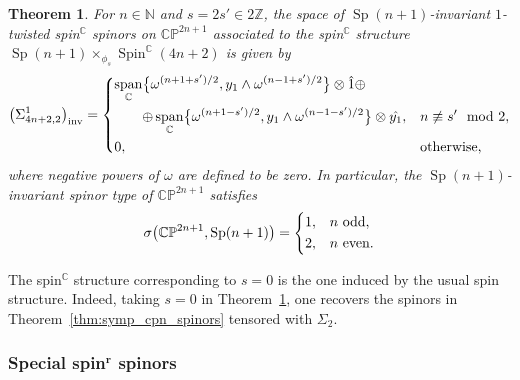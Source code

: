 \documentclass[pdftex]{sigma}
\numberwithin{equation}{section}
\newtheorem{Theorem}{Theorem}[section]
\newcommand{\Z}{\mathbb{Z}} %
\newcommand{\N}{\mathbb{N}} %
\newcommand{\C}{\mathbb{C}} %
\DeclareMathOperator{\vecspan}{span}
\DeclareMathOperator{\Spin}{Spin}
\DeclareMathOperator{\Sp}{Sp}
\begin{document}
		\begin{Theorem} \label{thm:inv_gen_cpn2}
			For $n \in \N$ and $s=2s' \in 2\Z$, the space  of $\Sp(n+1)$-invariant $1$-twisted spin$^{\mathbb{C}}$ spinors on $\mathbb{CP}^{2n+1}$ associated to the spin$^{\mathbb{C}}$ structure $\Sp(n+1) \times_{\phi_s} \Spin^{\mathbb{C}}(4n+2)$ is given by
			\begin{equation*}
				\bigl(\Sigma_{4n+2,2}^{1}\bigr)_{\mathrm{inv}} =
				\begin{dcases}
					\vecspan_{\mathbb{C}} \bigl\{ \omega^{(n+1+s')/2} , y_1 \wedge \omega^{(n-1+s')/2} \bigr\} \otimes \hat{1} \oplus \\
					\qquad \oplus \vecspan_{\mathbb{C}}\bigl\{ \omega^{(n+1-s')/2} , y_1 \wedge \omega^{(n-1-s')/2} \bigr\} \otimes \hat{y_1}, & n \not\equiv s' \mod 2 , \\
					0, & \text{otherwise, }
				\end{dcases}
			\end{equation*}
			where negative powers of $\omega$ are defined to be zero. In particular, the $\Sp(n+1)$-invariant spinor type of $\mathbb{CP}^{2n+1}$ satisfies
			\begin{equation*}
				\sigma\bigl( \mathbb{CP}^{2n+1} , \Sp(n+1) \bigr) =
				\begin{dcases}
					1 , & n\  \text{odd}, \\
					2 ,& n\  \text{even}.
				\end{dcases}
			\end{equation*}
		\end{Theorem}
		\begin{Remark}
			The spin$^{\C}$ structure corresponding to $s=0$ is the one induced by the usual spin structure. Indeed, taking $s=0$ in Theorem~\ref{thm:inv_gen_cpn2}, one recovers the spinors in Theorem~\ref{thm:symp_cpn_spinors} tensored with $\Sigma_2$.
		\end{Remark}
		
		\subsubsection[Special spin\^{}r spinors]{Special spin$^{\boldsymbol{r}}$ spinors}
		
\end{document}
